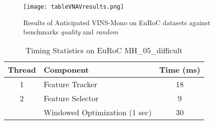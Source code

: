 \begin{figure}
	\centering
	\texttt{[image: tableVNAVresults.png]} 
	\caption{Results of Anticipated VINS-Mono on EuRoC datasets against benchmarks \textit{quality} and \textit{random}}
	\label{tab:results} 
\end{figure}

\begin{table}[h]
    \centering
    \caption{Timing Statistics on EuRoC MH\_05\_difficult}
    \begin{tabular}{clc}
        \toprule
        Thread & Component & Time (ms) \\
        \midrule
        1 & Feature Tracker & 18 \\
        \midrule
        2 & Feature Selector & 9 \\
          & Windowed Optimization (1 sec) & 30 \\
        \bottomrule
    \end{tabular}
    \label{tab:timing}
\end{table}
